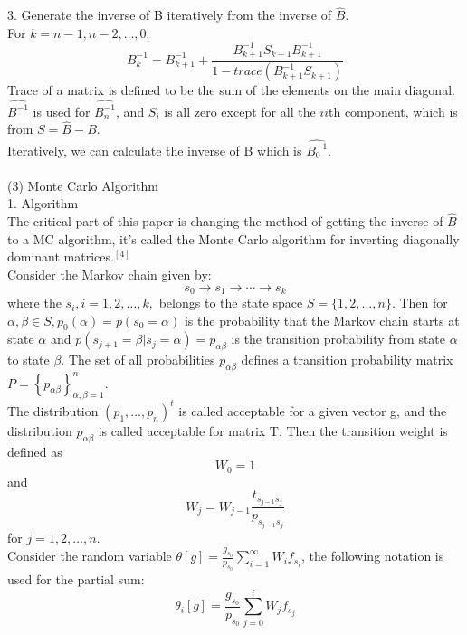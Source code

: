 \documentclass[10pt,journal]{IEEEtran}
\begin{document}
3. Generate the inverse of B iteratively from the inverse of $\hat{B}$.\\
For $k=n-1, n-2, \ldots, 0$:
\[B _ { k } ^ { - 1 } = B _ { k + 1 } ^ { - 1 } + \frac { B _ { k + 1 } ^ { - 1 } S _ { k + 1 } B _ { k + 1 } ^ { - 1 } } { 1 - trace \left( B _ { k + 1 } ^ { - 1 } S _ { k + 1 } \right) }\]
Trace of a matrix is defined to be the sum of the elements on the main diagonal. $\hat{B^{-1}}$ is used for $\hat{B_n^{-1}}$, and $S_i$ is all zero except for all the ${ii}$th component, which is from $S=\hat{B}-B$. \\
Iteratively, we can calculate the inverse of B which is $\hat{B_0^{-1}}$.\\\\
(3) Monte Carlo Algorithm\\
1. Algorithm\\
The critical part of this paper is changing the method of getting the inverse of $\hat{B}$ to a MC algorithm, it's called the Monte Carlo algorithm for inverting diagonally dominant matrices.$^{[4]}$\\
Consider the Markov chain given by:  
\[s _ { 0 } \rightarrow s _ { 1 } \rightarrow \cdots \rightarrow s _ { k }\]
where the $ s _ { i } , i = 1, 2 , \ldots , k, $ belongs to the state space $ S =\{ 1,2 , \ldots , n \}$. Then for $\alpha , \beta \in S , p _ { 0 } ( \alpha ) = p \left( s _ { 0 } = \alpha \right)$ is the probability that the Markov chain starts at state $\alpha$ and $p \left( s _ { j + 1 } = \beta | s _ { j } = \alpha \right) = p _ { \alpha \beta }$ is the transition probability from state $\alpha$ to state $\beta$. The set of all probabilities $p _ { \alpha \beta }$ defines a transition probability matrix $P = \left\{ p _ { \alpha \beta } \right\} _ { \alpha , \beta = 1 } ^ { n }$.\\
The distribution $\left( p _ { 1 } , \ldots , p _ { n } \right) ^ { t }$ is called acceptable for a given vector g, and the distribution $p _ { \alpha \beta }$ is called acceptable for matrix T. Then the transition weight is defined as
\[W_0=1\]
and 
\[W _ { j } = W _ { j - 1 } \frac { t _ { s _ { j - 1 } s _ { j } } } { p _ { s _ { j - 1 } s _ { j } } }\]
for $j = 1,2 , \dots , n$.\\
Consider the random variable $\theta [ g ] = \frac { g _ { s _ { 0 } } } { p _ { s _ { 0 } } } \sum _ { i = 1 } ^ { \infty } W _ { i } f _ { s _ { i } }$, the following notation is used for the partial sum:
\[\theta _ { i } [ g ] = \frac { g _ { s _ { 0 } } } { p _ { s _ { 0 } } } \sum _ { j = 0 } ^ { i } W _ { j } f _ { s _ { j } }\]
\end{document}
